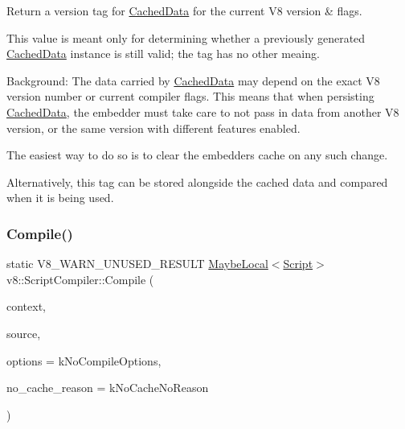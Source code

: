 Return a version tag for \mbox{\hyperlink{structv8_1_1ScriptCompiler_1_1CachedData}{Cached\+Data}} for the current V8 version \& flags.

This value is meant only for determining whether a previously generated \mbox{\hyperlink{structv8_1_1ScriptCompiler_1_1CachedData}{Cached\+Data}} instance is still valid; the tag has no other meaing.

Background\+: The data carried by \mbox{\hyperlink{structv8_1_1ScriptCompiler_1_1CachedData}{Cached\+Data}} may depend on the exact V8 version number or current compiler flags. This means that when persisting \mbox{\hyperlink{structv8_1_1ScriptCompiler_1_1CachedData}{Cached\+Data}}, the embedder must take care to not pass in data from another V8 version, or the same version with different features enabled.

The easiest way to do so is to clear the embedder\textquotesingle{}s cache on any such change.

Alternatively, this tag can be stored alongside the cached data and compared when it is being used. \mbox{\label{classv8_1_1ScriptCompiler_a217bcf520f4ed70f6f02afeabfe60319}} 
\subsubsection{\texorpdfstring{Compile()}{Compile()}\hspace{0.1cm}{\footnotesize\ttfamily [1/2]}}
{\footnotesize\ttfamily static V8\+\_\+\+W\+A\+R\+N\+\_\+\+U\+N\+U\+S\+E\+D\+\_\+\+R\+E\+S\+U\+LT \mbox{\hyperlink{classv8_1_1MaybeLocal}{Maybe\+Local}}$<$\mbox{\hyperlink{classv8_1_1Script}{Script}}$>$ v8\+::\+Script\+Compiler\+::\+Compile (\begin{DoxyParamCaption}\item[{\mbox{\hyperlink{classv8_1_1Local}{Local}}$<$ Context $>$}]{context,  }\item[{\mbox{\hyperlink{classv8_1_1ScriptCompiler_1_1Source}{Source}} $\ast$}]{source,  }\item[{Compile\+Options}]{options = {\ttfamily kNoCompileOptions},  }\item[{\mbox{\hyperlink{classv8_1_1ScriptCompiler_a7f13fa15484cfc500ae51927756e0d60}{No\+Cache\+Reason}}}]{no\+\_\+cache\+\_\+reason = {\ttfamily kNoCacheNoReason} }\end{DoxyParamCaption})\hspace{0.3cm}{\ttfamily [static]}}

